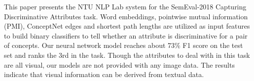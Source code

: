 This paper presents the NTU NLP Lab system for the SemEval-2018 Capturing Discriminative Attributes task. Word embeddings, pointwise mutual information (PMI), ConceptNet edges and shortest path lengths are utilized as input features to build binary classifiers to tell whether an attribute is discriminative for a pair of concepts. Our neural network model reaches about 73\% F1 score on the test set and ranks the 3rd in the task. Though the attributes to deal with in this task are all visual, our models are not provided with any image data. The results indicate that visual information can be derived from textual data.
